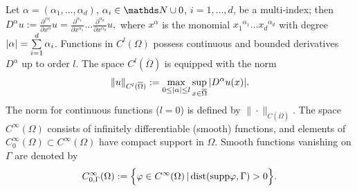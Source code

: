 %

\noindent
Let $\alpha = (\alpha_1, \ldots ,\alpha_d)$, $\alpha_i \in \Nd \cup {0}$, 
$i = 1, \ldots, d$, be a multi-index; then \linebreak
%
$	D^\alpha u 
	:= \tfrac{\partial^{|\alpha|}}{\partial x^{\alpha}} u 
	= \tfrac{\partial^{\alpha_1}}{\partial x^{\alpha_1}} \ldots 
		\tfrac{\partial^{\alpha_d}}{\partial x^{\alpha_d}} u,
$	%
%
where $x^\alpha$ is the monomial ${x_1}^{\alpha_1} \ldots {x_d}^{\alpha_d}$ with 
degree $|\alpha| = \sum\limits_{i = 1}^{d} \alpha_i$. 
%
Functions in $C^{l}(\Omega)$ possess continuous and 
bounded derivatives $D^\alpha$ up to order $l$. The space 
$C^{l}(\overline{\Omega})$ is 
equipped with the norm 
%
\begin{equation*}
	\| u \|_{C^{l}(\overline{\Omega})} := \Max_{0 \leq |\alpha| \leq l} 
	\Sup_{x \in {\overline{\Omega}}} |D^\alpha u(x)|.
\end{equation*}
%
The norm for continuous functions ($l = 0$) is defined by 
$\| \cdot \|_{C(\overline{\Omega})}$.
The space $C^{\infty}(\Omega)$ consists of infinitely differentiable (smooth) 
functions, and elements of $C^{\infty}_{0}(\Omega) \subset C^{\infty}(\Omega)$ 
have compact support in 
$\Omega$. Smooth functions vanishing on $\Gamma$ are denoted by
%
\begin{equation}
	C^{\infty}_{0, \Gamma}(\Omega) 
	:= \Big\{ \varphi \in C^{\infty} (\Omega) \, | \, 
				{\rm dist} ({\rm supp} \varphi, \Gamma ) > 0 \Big\}.
	\label{eq:homogenous-G}
\end{equation}


